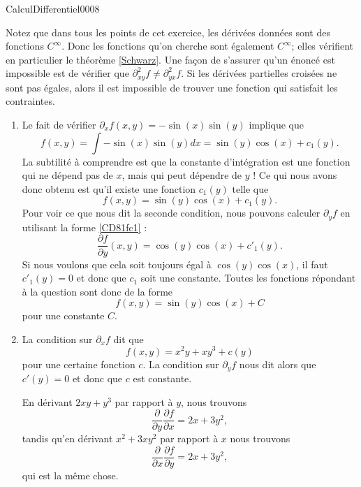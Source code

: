 \begin{corrige}{CalculDifferentiel0008}

	Notez que dans tous les points de cet exercice, les dérivées données sont des fonctions $C^{\infty}$. Donc les fonctions qu'on cherche sont également $C^{\infty}$; elles vérifient en particulier le théorème \ref{Schwarz}. Une façon de s'assurer qu'un énoncé est impossible est de vérifier que $\partial^2_{xy}f\neq\partial^2_{yx}f$. Si les dérivées partielles croisées ne sont pas égales, alors il est impossible de trouver une fonction qui satisfait les contraintes.

	\begin{enumerate}
		\item
			Le fait de vérifier $\partial_xf(x,y)=-\sin(x)\sin(y)$ implique que
			\begin{equation}
				f(x,y)=\int -\sin(x)\sin(y)dx=\sin(y)\cos(x)+c_1(y).
			\end{equation}
			La subtilité à comprendre est que la constante d'intégration est une fonction qui ne dépend pas de $x$, mais qui peut dépendre de $y$ ! Ce qui nous avons donc obtenu est qu'il existe une fonction $c_1(y)$ telle que
			\begin{equation}	\label{CD81fc1}
				f(x,y)=\sin(y)\cos(x)+c_1(y).
			\end{equation}
			Pour voir ce que nous dit la seconde condition, nous pouvons calculer $\partial_yf$ en utilisant la forme \eqref{CD81fc1} :
			\begin{equation}
				\frac{ \partial f }{ \partial y }(x,y)=\cos(y)\cos(x)+c'_1(y).
			\end{equation}
			Si nous voulons que cela soit toujours égal à $\cos(y)\cos(x)$, il faut $c'_1(y)=0$ et donc que $c_1$ soit une constante. Toutes les fonctions répondant à la question sont donc de la forme
			\begin{equation}
				f(x,y)=\sin(y)\cos(x)+C
			\end{equation}
			pour une constante $C$.

		\item
			La condition sur $\partial_xf$ dit que
			\begin{equation}
				f(x,y)=x^2y+xy^3+c(y)
			\end{equation}
			pour une certaine fonction $c$. La condition sur $\partial_yf$ nous dit alors que $c'(y)=0$ et donc que $c$ est constante.

			En dérivant $2xy+y^3$ par rapport à $y$, nous trouvons
			\begin{equation}
				\frac{ \partial  }{ \partial y }\frac{ \partial f }{ \partial x }=2x+3y^2,
			\end{equation}
			tandis qu'en dérivant $x^2+3xy^2$ par rapport à $x$ nous trouvons
			\begin{equation}
				\frac{ \partial  }{ \partial x }\frac{ \partial f }{ \partial y }=2x+3y^2,
			\end{equation}
			qui est la même chose.


\end{enumerate}
\end{corrige}
